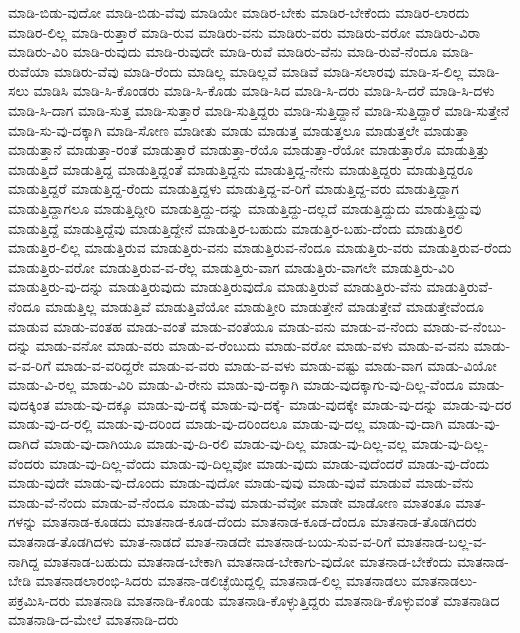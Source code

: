{ಮಾಡಿ-ಬಿಡು-ವುದೋ
ಮಾಡಿ-ಬಿಡು-ವೆವು
ಮಾಡಿಯೇ
ಮಾಡಿರ-ಬೇಕು
ಮಾಡಿರ-ಬೇಕೆಂದು
ಮಾಡಿರ-ಲಾರದು
ಮಾಡಿರ-ಲಿಲ್ಲ
ಮಾಡಿ-ರುತ್ತಾರೆ
ಮಾಡಿ-ರುವ
ಮಾಡಿರು-ವನು
ಮಾಡಿರು-ವರು
ಮಾಡಿರು-ವರೋ
ಮಾಡಿರು-ವಿರಾ
ಮಾಡಿರು-ವಿರಿ
ಮಾಡಿ-ರುವುದು
ಮಾಡಿ-ರುವುದೇ
ಮಾಡಿ-ರುವೆ
ಮಾಡಿರು-ವೆನು
ಮಾಡಿ-ರುವೆ-ನೆಂದೂ
ಮಾಡಿ-ರುವೆಯಾ
ಮಾಡಿರು-ವೆವು
ಮಾಡಿ-ರೆಂದು
ಮಾಡಿಲ್ಲ
ಮಾಡಿಲ್ಲವೆ
ಮಾಡಿವೆ
ಮಾಡಿ-ಸಲಾರವು
ಮಾಡಿ-ಸ-ಲಿಲ್ಲ
ಮಾಡಿ-ಸಲು
ಮಾಡಿಸಿ
ಮಾಡಿ-ಸಿ-ಕೊಂಡರು
ಮಾಡಿ-ಸಿ-ಕೊಡು
ಮಾಡಿ-ಸಿದ
ಮಾಡಿ-ಸಿ-ದರು
ಮಾಡಿ-ಸಿ-ದರೆ
ಮಾಡಿ-ಸಿ-ದಳು
ಮಾಡಿ-ಸಿ-ದಾಗ
ಮಾಡಿ-ಸುತ್ತ
ಮಾಡಿ-ಸುತ್ತಾರೆ
ಮಾಡಿ-ಸುತ್ತಿದ್ದರು
ಮಾಡಿ-ಸುತ್ತಿದ್ದಾನೆ
ಮಾಡಿ-ಸುತ್ತಿದ್ದಾರೆ
ಮಾಡಿ-ಸುತ್ತೇನೆ
ಮಾಡಿ-ಸು-ವು-ದಕ್ಕಾಗಿ
ಮಾಡಿ-ಸೋಣ
ಮಾಡೀತು
ಮಾಡು
ಮಾಡುತ್ತ
ಮಾಡುತ್ತಲೂ
ಮಾಡುತ್ತಲೇ
ಮಾಡುತ್ತಾ
ಮಾಡುತ್ತಾನೆ
ಮಾಡುತ್ತಾ-ರಂತೆ
ಮಾಡುತ್ತಾರೆ
ಮಾಡುತ್ತಾ-ರೆಯೊ
ಮಾಡುತ್ತಾ-ರೆಯೋ
ಮಾಡುತ್ತಾರೊ
ಮಾಡುತ್ತಿತ್ತು
ಮಾಡುತ್ತಿದೆ
ಮಾಡುತ್ತಿದ್ದ
ಮಾಡುತ್ತಿದ್ದಂತೆ
ಮಾಡುತ್ತಿದ್ದನು
ಮಾಡುತ್ತಿದ್ದ-ನೇನು
ಮಾಡುತ್ತಿದ್ದರು
ಮಾಡುತ್ತಿದ್ದರೂ
ಮಾಡುತ್ತಿದ್ದರೆ
ಮಾಡುತ್ತಿದ್ದ-ರೆಂದು
ಮಾಡುತ್ತಿದ್ದಳು
ಮಾಡುತ್ತಿದ್ದ-ವ-ರಿಗೆ
ಮಾಡುತ್ತಿದ್ದ-ವರು
ಮಾಡುತ್ತಿದ್ದಾಗ
ಮಾಡುತ್ತಿದ್ದಾಗಲೂ
ಮಾಡುತ್ತಿದ್ದೀರಿ
ಮಾಡುತ್ತಿದ್ದು-ದನ್ನು
ಮಾಡುತ್ತಿದ್ದು-ದಲ್ಲದೆ
ಮಾಡುತ್ತಿದ್ದುದು
ಮಾಡುತ್ತಿದ್ದುವು
ಮಾಡುತ್ತಿದ್ದೆ
ಮಾಡುತ್ತಿದ್ದೆವು
ಮಾಡುತ್ತಿದ್ದೇನೆ
ಮಾಡುತ್ತಿರ-ಬಹುದು
ಮಾಡುತ್ತಿರ-ಬಹು-ದೆಂದು
ಮಾಡುತ್ತಿರಲಿ
ಮಾಡುತ್ತಿರ-ಲಿಲ್ಲ
ಮಾಡುತ್ತಿರುವ
ಮಾಡುತ್ತಿರು-ವನು
ಮಾಡುತ್ತಿರುವ-ನೆಂದೂ
ಮಾಡುತ್ತಿರು-ವರು
ಮಾಡುತ್ತಿರುವ-ರೆಂದು
ಮಾಡುತ್ತಿರು-ವರೋ
ಮಾಡುತ್ತಿರುವ-ವ-ರೆಲ್ಲ
ಮಾಡುತ್ತಿರು-ವಾಗ
ಮಾಡುತ್ತಿರು-ವಾಗಲೇ
ಮಾಡುತ್ತಿರು-ವಿರಿ
ಮಾಡುತ್ತಿರು-ವು-ದನ್ನು
ಮಾಡುತ್ತಿರುವುದು
ಮಾಡುತ್ತಿರುವುದೊ
ಮಾಡುತ್ತಿರುವೆ
ಮಾಡುತ್ತಿರು-ವೆನು
ಮಾಡುತ್ತಿರುವೆ-ನೆಂದೂ
ಮಾಡುತ್ತಿಲ್ಲ
ಮಾಡುತ್ತಿವೆ
ಮಾಡುತ್ತಿವೆಯೋ
ಮಾಡುತ್ತೀರಿ
ಮಾಡುತ್ತೇನೆ
ಮಾಡುತ್ತೇವೆ
ಮಾಡುತ್ತೇವೆಂದೂ
ಮಾಡುವ
ಮಾಡು-ವಂತಹ
ಮಾಡು-ವಂತೆ
ಮಾಡು-ವಂತೆಯೂ
ಮಾಡು-ವನು
ಮಾಡು-ವ-ನೆಂದು
ಮಾಡು-ವ-ನೆಂಬು-ದನ್ನು
ಮಾಡು-ವನೋ
ಮಾಡು-ವರು
ಮಾಡು-ವ-ರೆಂಬುದು
ಮಾಡು-ವರೋ
ಮಾಡು-ವಳು
ಮಾಡು-ವ-ವನು
ಮಾಡು-ವ-ವ-ರಿಗೆ
ಮಾಡು-ವ-ವರಿದ್ದರೇ
ಮಾಡು-ವ-ವರು
ಮಾಡು-ವ-ವಳು
ಮಾಡು-ವಷ್ಟು
ಮಾಡು-ವಾಗ
ಮಾಡು-ವಿಯೋ
ಮಾಡು-ವಿ-ರಲ್ಲ
ಮಾಡು-ವಿರಿ
ಮಾಡು-ವಿ-ರೇನು
ಮಾಡು-ವು-ದಕ್ಕಾಗಿ
ಮಾಡು-ವುದಕ್ಕಾಗು-ವು-ದಿಲ್ಲ-ವೆಂದೂ
ಮಾಡು-ವುದಕ್ಕಿಂತ
ಮಾಡು-ವು-ದಕ್ಕೂ
ಮಾಡು-ವು-ದಕ್ಕೆ
ಮಾಡು-ವು-ದಕ್ಕೆ-
ಮಾಡು-ವುದಕ್ಕೇ
ಮಾಡು-ವು-ದನ್ನು
ಮಾಡು-ವು-ದರ
ಮಾಡು-ವು-ದ-ರಲ್ಲಿ
ಮಾಡು-ವು-ದರಿಂದ
ಮಾಡು-ವು-ದರಿಂದಲೂ
ಮಾಡು-ವು-ದಲ್ಲ
ಮಾಡು-ವು-ದಾಗಿ
ಮಾಡು-ವು-ದಾಗಿದೆ
ಮಾಡು-ವು-ದಾಗಿಯೂ
ಮಾಡು-ವು-ದಿ-ರಲಿ
ಮಾಡು-ವು-ದಿಲ್ಲ
ಮಾಡು-ವು-ದಿಲ್ಲ-ವಲ್ಲ
ಮಾಡು-ವು-ದಿಲ್ಲ-ವೆಂದರು
ಮಾಡು-ವು-ದಿಲ್ಲ-ವೆಂದು
ಮಾಡು-ವು-ದಿಲ್ಲವೋ
ಮಾಡು-ವುದು
ಮಾಡು-ವುದೆಂದರೆ
ಮಾಡು-ವು-ದೆಂದು
ಮಾಡು-ವುದೇ
ಮಾಡು-ವು-ದೊಂದು
ಮಾಡು-ವುದೋ
ಮಾಡು-ವುವು
ಮಾಡು-ವುವೆ
ಮಾಡುವೆ
ಮಾಡು-ವೆನು
ಮಾಡು-ವೆ-ನೆಂದು
ಮಾಡು-ವೆ-ನೆಂದೂ
ಮಾಡು-ವೆವು
ಮಾಡು-ವೆವೋ
ಮಾಡೇ
ಮಾಡೋಣ
ಮಾತಂತೂ
ಮಾತ-ಗಳನ್ನು
ಮಾತನಾಡ-ಕೂಡದು
ಮಾತನಾಡ-ಕೂಡ-ದೆಂದು
ಮಾತನಾಡ-ಕೂಡ-ದೆಂದೂ
ಮಾತನಾಡ-ತೊಡಗಿದರು
ಮಾತನಾಡ-ತೊಡಗಿದಳು
ಮಾತ-ನಾಡದೆ
ಮಾತ-ನಾಡದೇ
ಮಾತನಾಡ-ಬಯ-ಸುವ-ವ-ರಿಗೆ
ಮಾತನಾಡ-ಬಲ್ಲ-ವ-ನಾಗಿದ್ದ
ಮಾತನಾಡ-ಬಹುದು
ಮಾತನಾಡ-ಬೇಕಾಗಿ
ಮಾತನಾಡ-ಬೇಕಾಗು-ವುದೋ
ಮಾತನಾಡ-ಬೇಕೆಂದು
ಮಾತನಾಡ-ಬೇಡಿ
ಮಾತನಾಡಲಾರಂಭಿ-ಸಿದರು
ಮಾತನಾ-ಡಲಿಚ್ಛೆಯಿದ್ದಲ್ಲಿ
ಮಾತನಾಡ-ಲಿಲ್ಲ
ಮಾತನಾಡಲು
ಮಾತನಾಡಲು-ಪಕ್ರಮಿಸಿ-ದರು
ಮಾತನಾಡಿ
ಮಾತನಾಡಿ-ಕೊಂಡು
ಮಾತನಾಡಿ-ಕೊಳ್ಳುತ್ತಿದ್ದರು
ಮಾತನಾಡಿ-ಕೊಳ್ಳುವಂತೆ
ಮಾತನಾಡಿದ
ಮಾತನಾಡಿ-ದ-ಮೇಲೆ
ಮಾತನಾಡಿ-ದರು
}
